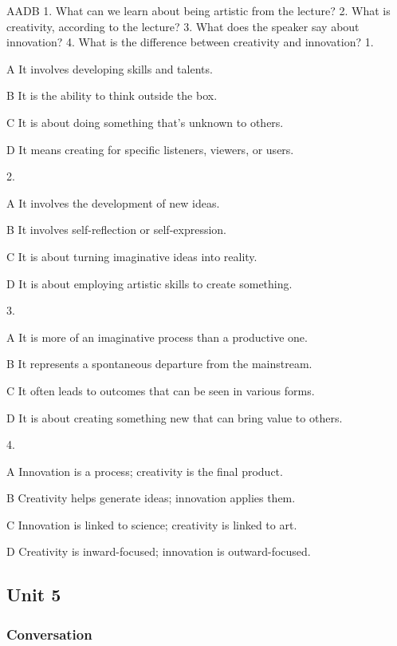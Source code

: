 \begin{enumerate}
	AADB
	1. What can we learn about being artistic from the lecture?
	2. What is creativity, according to the lecture?
	3. What does the speaker say about innovation?
	4. What is the difference between creativity and innovation?
	1.
	
	A
	It involves developing skills and talents.
	
	B
	It is the ability to think outside the box.
	
	C
	It is about doing something that's unknown to others.
	
	D
	It means creating for specific listeners, viewers, or users.
	
	2.
	
	A
	It involves the development of new ideas.
	
	B
	It involves self-reflection or self-expression.
	
	C
	It is about turning imaginative ideas into reality.
	
	D
	It is about employing artistic skills to create something.
	
	3.
	
	A
	It is more of an imaginative process than a productive one.
	
	B
	It represents a spontaneous departure from the mainstream.
	
	C
	It often leads to outcomes that can be seen in various forms.
	
	D
	It is about creating something new that can bring value to others.
	
	4.
	
	A
	Innovation is a process; creativity is the final product.
	
	B
	Creativity helps generate ideas; innovation applies them.
	
	C
	Innovation is linked to science; creativity is linked to art.
	
	D
	Creativity is inward-focused; innovation is outward-focused.
\end{enumerate}

\newpage
\subsection{Unit 5}

\subsubsection{Conversation}

